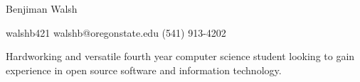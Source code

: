\documentclass[12pt,letterpaper]{article}
\begin{document}
	\centering
	{\huge
		Benjiman Walsh
	}

	\vspace{0.25cm}
    
    \hspace{1.75cm}
    \raggedright
    \faGithub 
	\hspace{0.15cm}
	walshb421
	\hspace{0.75cm}
	\faEnvelope
	\hspace{0.15cm}
	walshb@oregonstate.edu	
	\hspace{0.75cm}
	\faPhone
	\hspace{0.15cm}
	(541) 913-4202
	
	\noindent\makebox[\linewidth]{\rule{\linewidth}{0.4pt}}
	
	
	\raggedright
	
	Hardworking and versatile fourth year computer science student looking to gain experience in open source software and information technology.
	
	\hspace{1cm}
	
\end{document}

